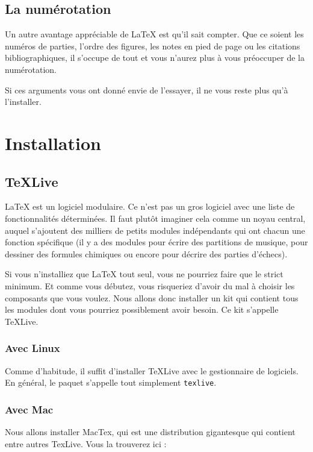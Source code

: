 \documentclass[10pt]{article}
\begin{document}
\subsection{La numérotation}

Un autre avantage appréciable de LaTeX est qu'il sait compter. Que ce soient les numéros de parties, l'ordre des figures, les notes en pied de page ou les citations bibliographiques, il s'occupe de tout et vous n'aurez plus à vous préoccuper de la numérotation.

Si ces arguments vous ont donné envie de l'essayer, il ne vous reste plus qu'à l'installer.

\section{Installation}

\subsection{TeXLive}
LaTeX est un logiciel modulaire. Ce n'est pas un gros logiciel avec une liste de fonctionnalités déterminées. Il faut plutôt imaginer cela comme un noyau central, auquel s'ajoutent des milliers de petits modules indépendants qui ont chacun une fonction spécifique (il y a des modules pour écrire des partitions de musique, pour dessiner des formules chimiques ou encore pour décrire des parties d'échecs).

Si vous n'installiez que LaTeX tout seul, vous ne pourriez faire que le strict minimum. Et comme vous débutez, vous risqueriez d'avoir du mal à choisir les composants que vous voulez. Nous allons donc installer un kit qui contient tous les modules dont vous pourriez possiblement avoir besoin. Ce kit s'appelle TeXLive.

\subsubsection{Avec Linux}
Comme d'habitude, il suffit d'installer TeXLive avec le gestionnaire de logiciels. En général, le paquet s'appelle tout simplement \verb?texlive?.


\subsubsection{Avec Mac}
Nous allons installer MacTex, qui est une distribution gigantesque qui contient entre autres TexLive. Vous la trouverez ici :
\end{document}
